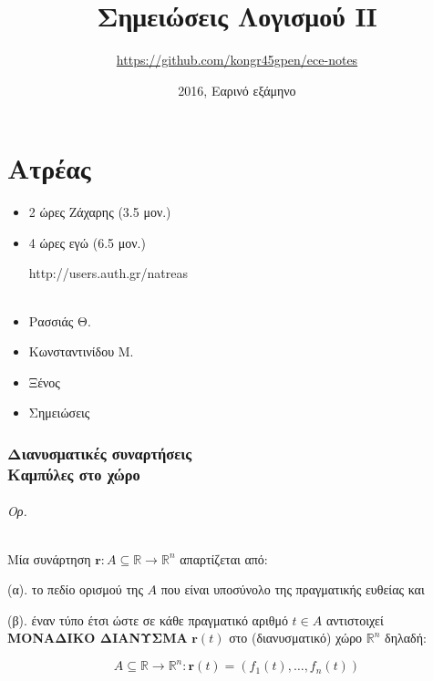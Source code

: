 \documentclass[11pt,a4paper,titlepage]{article}
\title{Σημειώσεις Λογισμού ΙΙ}
\date{2016, Εαρινό εξάμηνο}
\author{\textlatin{\url{https://github.com/kongr45gpen/ece-notes}}}
\newcommand{\textlatin}[1]{#1}
\begin{document}
\maketitle

\tableofcontents

\newpage

\part{Ατρέας}

\setcounter{section}{-1}

\begin{itemize}
\item 2 ώρες Ζάχαρης (3.5 μον.)
\item 4 ώρες εγώ (6.5 μον.)

\textlatin{http://users.auth.gr/natreas}
\end{itemize}

\paragraph{}

\begin{itemize}
\item Ρασσιάς Θ.
\item Κωνσταντινίδου Μ.
\item Ξένος
\item Σημειώσεις
\end{itemize}

\section[Διανυσματικές συναρτήσεις \& καμπύλες στο χώρο]{Διανυσματικές συναρτήσεις \\ Καμπύλες στο χώρο}

\paragraph{Ορ.}
Μία συνάρτηση \( \mathbf{r}: A \subseteq \mathbb R \rightarrow \mathbb R ^ n \) απαρτίζεται από:

(α). το πεδίο ορισμού της \(A\) που είναι υποσύνολο της πραγματικής ευθείας και

(β). έναν τύπο έτσι ώστε σε κάθε πραγματικό αριθμό \(t \in A\) αντιστοιχεί \textbf{ΜΟΝΑΔΙΚΟ ΔΙΑΝΥΣΜΑ} \( \mathbf{r}(t) \) στο (διανυσματικό) χώρο \( \mathbb R ^ n \) δηλαδή:

\[
A \subseteq \mathbb R \rightarrow \mathbb R ^ n: \mathbf{r}(t) = \left( f_1(t), \dots, f_n(t) \right)
\]
\end{document}
